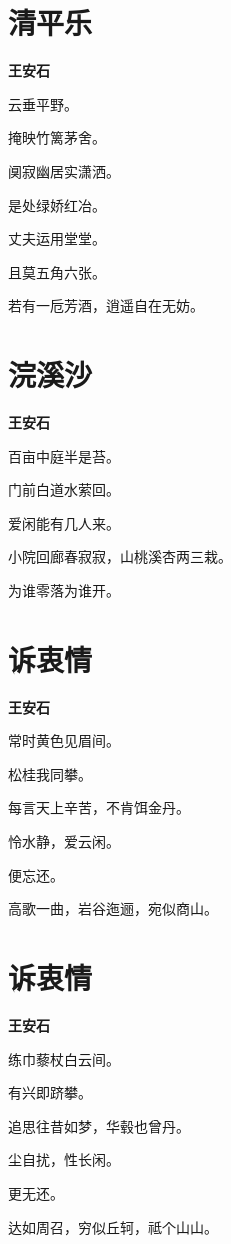 \documentclass[12pt,a4paper]{ctexbook}
\begin{document}
\section{清平乐}
\textbf{王安石}\par\vspace{0.5em}
云垂平野。\par
掩映竹篱茅舍。\par
阒寂幽居实潇洒。\par
是处绿娇红冶。\par
丈夫运用堂堂。\par
且莫五角六张。\par
若有一卮芳酒，逍遥自在无妨。\par

\section{浣溪沙}
\textbf{王安石}\par\vspace{0.5em}
百亩中庭半是苔。\par
门前白道水萦回。\par
爱闲能有几人来。\par
小院回廊春寂寂，山桃溪杏两三栽。\par
为谁零落为谁开。\par

\section{诉衷情}
\textbf{王安石}\par\vspace{0.5em}
常时黄色见眉间。\par
松桂我同攀。\par
每言天上辛苦，不肯饵金丹。\par
怜水静，爱云闲。\par
便忘还。\par
高歌一曲，岩谷迤逦，宛似商山。\par

\section{诉衷情}
\textbf{王安石}\par\vspace{0.5em}
练巾藜杖白云间。\par
有兴即跻攀。\par
追思往昔如梦，华毂也曾丹。\par
尘自扰，性长闲。\par
更无还。\par
达如周召，穷似丘轲，祗个山山。\par
\end{document}
